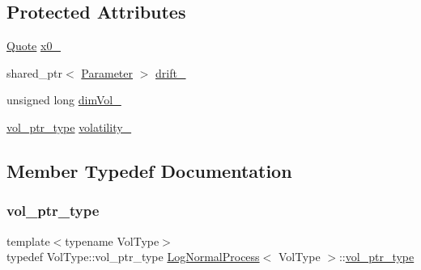 \subsection*{Protected Attributes}
\begin{DoxyCompactItemize}
\item 
\hyperlink{_name_def_8h_a642a6c5fd87319d922637de0e0bb0305}{Quote} \hyperlink{class_log_normal_process_aaad6cd95af55b1d573fa384ddb0066ef}{x0\+\_\+}
\item 
shared\+\_\+ptr$<$ \hyperlink{class_parameter}{Parameter} $>$ \hyperlink{class_log_normal_process_ae59abec9b1917c092665a99464f4af85}{drift\+\_\+}
\item 
unsigned long \hyperlink{class_log_normal_process_ae126cc386f39576fa62debd75443fa08}{dim\+Vol\+\_\+}
\item 
\hyperlink{class_log_normal_process_a904926553c5e4d60e52caf87e1745651}{vol\+\_\+ptr\+\_\+type} \hyperlink{class_log_normal_process_a90615a4b65992ad6fb280b18a9a705b3}{volatility\+\_\+}
\end{DoxyCompactItemize}


\subsection{Member Typedef Documentation}
\hypertarget{class_log_normal_process_a904926553c5e4d60e52caf87e1745651}{}\label{class_log_normal_process_a904926553c5e4d60e52caf87e1745651} 
\subsubsection{\texorpdfstring{vol\+\_\+ptr\+\_\+type}{vol\_ptr\_type}}
{\footnotesize\ttfamily template$<$typename Vol\+Type$>$ \\
typedef Vol\+Type\+::vol\+\_\+ptr\+\_\+type \hyperlink{class_log_normal_process}{Log\+Normal\+Process}$<$ Vol\+Type $>$\+::\hyperlink{class_log_normal_process_a904926553c5e4d60e52caf87e1745651}{vol\+\_\+ptr\+\_\+type}}

\hypertarget{class_log_normal_process_a160d9cd152962a42ac9fc016d0948c1c}{}\label{class_log_normal_process_a160d9cd152962a42ac9fc016d0948c1c} 

